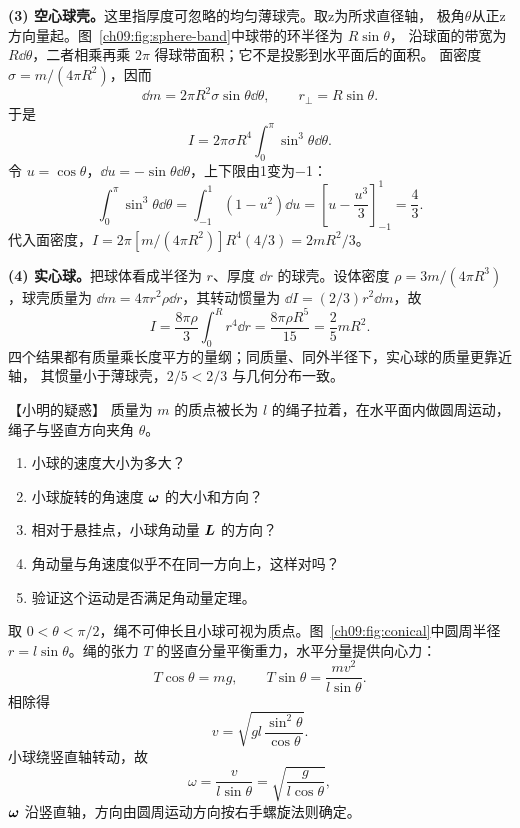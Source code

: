 {\begin{xesolution}
\textbf{(3) 空心球壳。}\quad 这里指厚度可忽略的均匀薄球壳。取z为所求直径轴，
极角$\theta$从正z方向量起。图~\ref{ch09:fig:sphere-band}中球带的环半径为 $R\sin\theta$，
沿球面的带宽为 $R\dd\theta$，二者相乘再乘 $2\pi$ 得球带面积；它不是投影到水平面后的面积。
\sphereBandDiagram
面密度 $\sigma=m/(4\pi R^2)$，因而
\[
 \dd m=2\pi R^2\sigma\sin\theta\dd\theta,
 \qquad r_\perp=R\sin\theta.
\]
于是
\[
 I=2\pi\sigma R^4\int_0^\pi\sin^3\theta\dd\theta.
\]
令 $u=\cos\theta$，$\dd u=-\sin\theta\dd\theta$，上下限由1变为−1：
\[
 \int_0^\pi\sin^3\theta\dd\theta
 =\int_{-1}^{1}(1-u^2)\dd u
 =\left[u-\frac{u^3}{3}\right]_{-1}^{1}=\frac43.
\]
代入面密度，$I=2\pi[m/(4\pi R^2)]R^4(4/3)=\boxed{2mR^2/3}$。

\textbf{(4) 实心球。}\quad 把球体看成半径为 $r$、厚度 $\dd r$ 的球壳。设体密度
$\rho=3m/(4\pi R^3)$，球壳质量为 $\dd m=4\pi r^2\rho\dd r$，其转动惯量为
$\dd I=(2/3)r^2\dd m$，故
\[
 I=\frac{8\pi\rho}{3}\int_0^Rr^4\dd r
 =\frac{8\pi\rho R^5}{15}
 =\boxed{\frac25mR^2}.
\]
四个结果都有质量乘长度平方的量纲；同质量、同外半径下，实心球的质量更靠近轴，
其惯量小于薄球壳，$2/5<2/3$ 与几何分布一致。
\end{xesolution}

\begin{origexamplebox}{【小明的疑惑】}\label{ch09:ex:s16-14-4}
质量为 $m$ 的质点被长为 $l$ 的绳子拉着，在水平面内做圆周运动，绳子与竖直方向夹角
$\theta$。
\begin{enumerate}[label=(\arabic*),leftmargin=2.2em]
  \item 小球的速度大小为多大？
  \item 小球旋转的角速度 $\bm{\omega}$ 的大小和方向？
  \item 相对于悬挂点，小球角动量 $\bm{L}$ 的方向？
  \item 角动量与角速度似乎不在同一方向上，这样对吗？
  \item 验证这个运动是否满足角动量定理。
\end{enumerate}


\ThQConePendulum
\end{origexamplebox}

\begin{xesolution}
\conicalPendulumDiagram

取 $0<\theta<\pi/2$，绳不可伸长且小球可视为质点。图~\ref{ch09:fig:conical}中圆周半径
$r=l\sin\theta$。绳的张力 $T$ 的竖直分量平衡重力，水平分量提供向心力：
\[
 T\cos\theta=mg,
 \qquad
 T\sin\theta=\frac{mv^2}{l\sin\theta}.
\]
相除得
\[
 \boxed{v=\sqrt{gl\,\frac{\sin^2\theta}{\cos\theta}}}.
\]
小球绕竖直轴转动，故
\[
 \boxed{\omega=\frac{v}{l\sin\theta}
 =\sqrt{\frac{g}{l\cos\theta}}},
\]
$\bm{\omega}$ 沿竖直轴，方向由圆周运动方向按右手螺旋法则确定。


\end{xesolution}}

